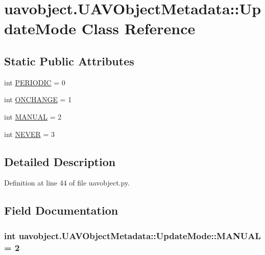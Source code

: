 \hypertarget{classuavobject_1_1_u_a_v_object_metadata_1_1_update_mode}{\section{uavobject.\-U\-A\-V\-Object\-Metadata\-:\-:\-Update\-Mode \-Class \-Reference}
\label{classuavobject_1_1_u_a_v_object_metadata_1_1_update_mode}
}
\subsection*{\-Static \-Public \-Attributes}
\begin{DoxyCompactItemize}
\item 
int \hyperlink{classuavobject_1_1_u_a_v_object_metadata_1_1_update_mode_a482ec2756660c8e9110139804e316378}{\-P\-E\-R\-I\-O\-D\-I\-C} = 0
\item 
int \hyperlink{classuavobject_1_1_u_a_v_object_metadata_1_1_update_mode_a4754f932582c4b4de21087d0741652a8}{\-O\-N\-C\-H\-A\-N\-G\-E} = 1
\item 
int \hyperlink{classuavobject_1_1_u_a_v_object_metadata_1_1_update_mode_ae4e993ee9b8ab76cfbd04487f502c220}{\-M\-A\-N\-U\-A\-L} = 2
\item 
int \hyperlink{classuavobject_1_1_u_a_v_object_metadata_1_1_update_mode_a9cb20e8f2903f47c338cd24e01c60dd3}{\-N\-E\-V\-E\-R} = 3
\end{DoxyCompactItemize}


\subsection{\-Detailed \-Description}


\-Definition at line 44 of file uavobject.\-py.



\subsection{\-Field \-Documentation}
\hypertarget{classuavobject_1_1_u_a_v_object_metadata_1_1_update_mode_ae4e993ee9b8ab76cfbd04487f502c220}{
\subsubsection[{\-M\-A\-N\-U\-A\-L}]{\setlength{\rightskip}{0pt plus 5cm}int {\bf uavobject.\-U\-A\-V\-Object\-Metadata\-::\-Update\-Mode\-::\-M\-A\-N\-U\-A\-L} = 2}}\label{classuavobject_1_1_u_a_v_object_metadata_1_1_update_mode_ae4e993ee9b8ab76cfbd04487f502c220}


